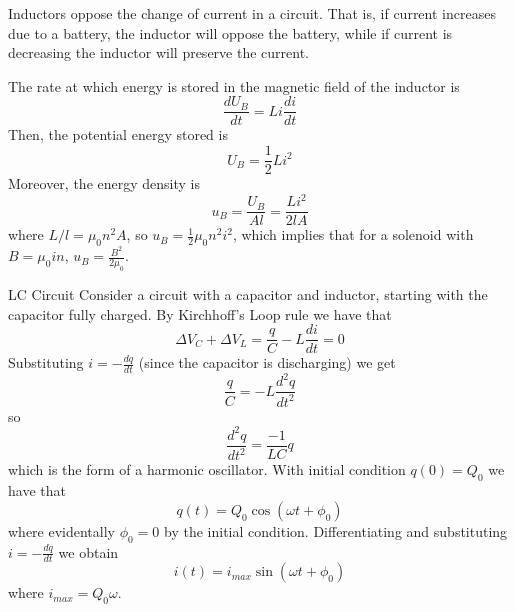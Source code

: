 \documentclass[12pt]{report}
\begin{document}
\begin{rmk}{}{}
        Inductors oppose the change of current in a circuit. That is, if current increases due to a battery, the inductor will oppose the battery, while if current is decreasing the inductor will preserve the current.
\end{rmk}



\begin{rmk}{}{}
        The rate at which energy is stored in the magnetic field of the inductor is \begin{equation}
                \frac{dU_B}{dt} = Li\frac{di}{dt}
        \end{equation}
        Then, the potential energy stored is \begin{equation}
                U_B = \frac{1}{2}Li^2
        \end{equation}
        Moreover, the energy density is \begin{equation}
                u_B = \frac{U_B}{Al} = \frac{Li^2}{2lA}
        \end{equation}
        where $L/l = \mu_0 n^2A$, so $u_B = \frac{1}{2}\mu_0n^2i^2$, which implies that for a solenoid with $B = \mu_0in$, $u_B = \frac{B^2}{2\mu_0}$.
\end{rmk}

\begin{rmk}{LC Circuit}{}
        Consider a circuit with a capacitor and inductor, starting with the capacitor fully charged. By Kirchhoff's Loop rule we have that \begin{equation}
                \Delta V_C + \Delta V_L = \frac{q}{C} - L \frac{di}{dt} = 0
        \end{equation}
        Substituting $i = -\frac{dq}{dt}$ (since the capacitor is discharging) we get \begin{equation}
                \frac{q}{C} = -L\frac{d^2q}{dt^2}
        \end{equation}
        so \begin{equation}
                \frac{d^2q}{dt^2} = \frac{-1}{LC}q
        \end{equation}
        which is the form of a harmonic oscillator. With initial condition $q(0) = Q_0$ we have that \begin{equation}
                q(t) = Q_0\cos(\omega t + \phi_0)
        \end{equation}
        where evidentally $\phi_0 = 0$ by the initial condition. Differentiating and substituting $i = -\frac{dq}{dt}$ we obtain \begin{equation}
                i(t) = i_{max}\sin(\omega t + \phi_0)
        \end{equation}
        where $i_{max} = Q_0\omega$.
\end{rmk}
\end{document}
